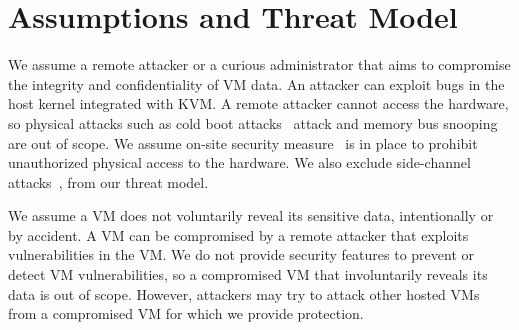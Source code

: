 \chapter{Assumptions and Threat Model}
\label{sec:threatmodel}

We assume a remote attacker or a curious administrator that aims to compromise
the integrity and confidentiality of VM data. An attacker can exploit bugs in
the host kernel integrated with KVM. A remote attacker cannot access the
hardware, so physical attacks such as cold boot attacks~\cite{coldboot}
attack and memory bus snooping are out of scope. We assume on-site security
measure~\cite{googlesecuritywhitepaper} is in place to prohibit unauthorized
physical access to the hardware. 
We also exclude side-channel attacks~\cite{ristenpart09sc,zhang12sc,irazoqui15sc,zhang14sc,liu15sc,backes13sc}, from our threat model. 

We assume a VM does not voluntarily reveal its sensitive data, intentionally
or by accident. A VM can be compromised by a remote attacker that 
exploits vulnerabilities in the VM. We do not provide security features to 
prevent or detect VM vulnerabilities, so a compromised VM that involuntarily 
reveals its data is out of scope. However, attackers may try to attack 
other hosted VMs from a compromised VM for which we provide protection. 
